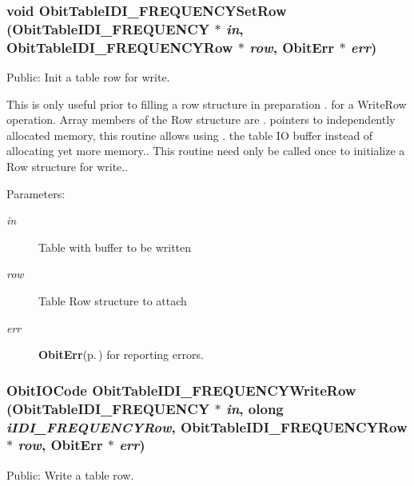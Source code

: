 \subsubsection{\setlength{\rightskip}{0pt plus 5cm}void Obit\-Table\-IDI\_\-FREQUENCYSet\-Row ({\bf Obit\-Table\-IDI\_\-FREQUENCY} $\ast$ {\em in}, {\bf Obit\-Table\-IDI\_\-FREQUENCYRow} $\ast$ {\em row}, {\bf Obit\-Err} $\ast$ {\em err})}\label{ObitTableIDI__FREQUENCY_8h_a19}


Public: Init a table row for write. 

This is only useful prior to filling a row structure in preparation . for a Write\-Row operation. Array members of the Row structure are . pointers to independently allocated memory, this routine allows using . the table IO buffer instead of allocating yet more memory.. This routine need only be called once to initialize a Row structure for write.. \begin{Desc}
\item[Parameters:]
\begin{description}
\item[{\em in}]Table with buffer to be written \item[{\em row}]Table Row structure to attach \item[{\em err}]{\bf Obit\-Err}{\rm (p.\,\pageref{structObitErr})} for reporting errors. \end{description}
\end{Desc}
\subsubsection{\setlength{\rightskip}{0pt plus 5cm}Obit\-IOCode Obit\-Table\-IDI\_\-FREQUENCYWrite\-Row ({\bf Obit\-Table\-IDI\_\-FREQUENCY} $\ast$ {\em in}, {\bf olong} {\em i\-IDI\_\-FREQUENCYRow}, {\bf Obit\-Table\-IDI\_\-FREQUENCYRow} $\ast$ {\em row}, {\bf Obit\-Err} $\ast$ {\em err})}\label{ObitTableIDI__FREQUENCY_8h_a20}


Public: Write a table row. 

